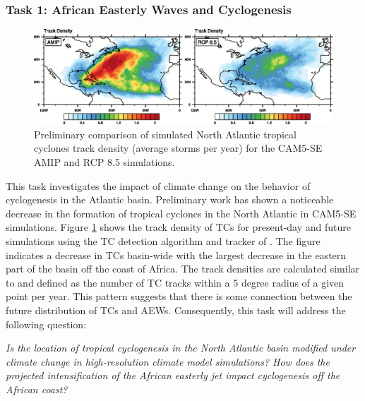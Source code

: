 \documentclass[11pt]{article}
\begin{document}
\subsubsection{Task 1: African Easterly Waves and Cyclogenesis} 

\begin{figure}[h]
\begin{center}
\includegraphics[width=6.in]{NA_track_density.eps}
\end{center}
\caption{Preliminary comparison of simulated North Atlantic tropical cyclones track density (average storms per year) for the CAM5-SE AMIP and RCP 8.5 simulations.} \label{fig:NA_density}
\end{figure}

This task investigates the impact of climate change on the behavior of cyclogenesis in the Atlantic basin.  Preliminary work has shown a noticeable decrease in the formation of tropical cyclones in the North Atlantic in CAM5-SE simulations.  Figure \ref{fig:NA_density} shows the track density of TCs for present-day and future simulations using the TC detection algorithm and tracker of \citet{Zhao2009}. The figure indicates a decrease in TCs basin-wide with the largest decrease in the eastern part of the basin off the coast of Africa. The track densities are calculated similar to \citet{Done2013} and defined as the number of TC tracks within a 5 degree radius of a given point per year. This pattern suggests that there is some connection between the future distribution of TCs and AEWs.  Consequently, this task will address the following question:

\textit{Is the location of tropical cyclogenesis in the North Atlantic basin modified under climate change in high-resolution climate model simulations? How does the projected intensification of the African easterly jet impact cyclogenesis off the African coast?}
\end{document}

